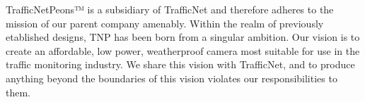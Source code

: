 TrafficNetPeons™ is a subsidiary of TrafficNet and therefore adheres to the mission of our parent company amenably. Within the realm of previously etablished designs, TNP has been born from a singular ambition. Our vision is to create an affordable, low power, weatherproof camera most suitable for use in the traffic monitoring industry. We share this vision with TrafficNet, and to produce anything beyond the boundaries of this vision violates our responsibilities to them.

